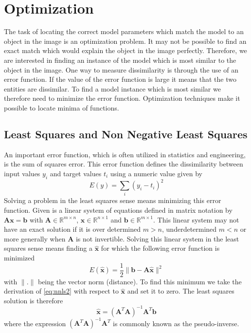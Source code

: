 \documentclass[11pt,a4paper]{report}
\begin{document}
\section{Optimization}
The task of locating the correct model parameters which match the model to an
object in the image is an optimization problem. It may not be possible to find
an exact match which would explain the object in the image perfectly. Therefore,
we are interested in finding an instance of the model which is most similar to the
object in the image. One way to measure dissimilarity is through the use of an error function. If the
value of the error function is large it means that the two entities are
dissimilar. To find a model instance which is most similar we therefore need to
minimize the error function. Optimization techniques make it possible to locate
minima of functions.

\subsection{Least Squares and Non Negative Least Squares}
An important error function, which is often utilized in statistics and engineering, is the
sum of squares error. This error function defines the dissimilarity between input
values $y_i$ and target values $t_i$ using a numeric value given by
\begin{equation}\label{eq:nnls}
E(y) = \sum_i (y_i - t_i)^2
\end{equation}
Solving a problem in the least squares sense means minimizing this error
function. Given is a linear system of equations defined in matrix notation by
$\mathbf{A}\mathbf{x} = \mathbf{b}$ with $\mathbf{A} \in \mathbb{R}^{m\times
  n}$, $\mathbf{x} \in \mathbb{R}^{n\times 1}$ and $\mathbf{b} \in
\mathbb{R}^{m\times 1}$. This linear system may not have an exact solution if it
is over determined $m > n$, underdetermined $m < n$  or more generally when
$\mathbf{A}$ is not invertible. Solving this linear system in the least squares sense
means finding a $\mathbf{\hat{x}}$ for which the following error function is
minimized
\begin{equation}\label{eq:nnls2}
E(\mathbf{\hat{x}}) = \frac{1}{2}\lVert \mathbf{b} - \mathbf{A\hat{x}} \rVert^2
\end{equation}
with $\lVert . \rVert$ being the vector norm (distance).
To find this minimum we take the derivation of \ref{eq:nnls2} with respect to
$\mathbf{\hat{x}}$ and set it to zero. The least squares solution is therefore
\begin{equation}\label{eq:nnls2}
\mathbf{\hat{x}} = (\mathbf{A}^T\mathbf{A})^{-1}\mathbf{A}^T\mathbf{b}
\end{equation}
where the expression $(\mathbf{A}^T\mathbf{A})^{-1}\mathbf{A}^T$ is commonly
known as the pseudo-inverse.
\end{document}
